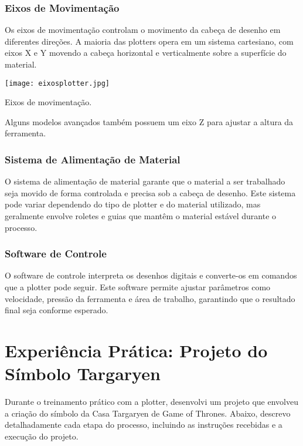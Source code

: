 \documentclass[
]{book}
\begin{document}
\subsubsection{Eixos de Movimentação}\label{eixos-de-movimentauxe7uxe3o-1}

Os eixos de movimentação controlam o movimento da cabeça de desenho em diferentes direções. A maioria das plotters opera em um sistema cartesiano, com eixos X e Y movendo a cabeça horizontal e verticalmente sobre a superfície do material.

\texttt{[image: eixosplotter.jpg]}

Eixos de movimentação.

Alguns modelos avançados também possuem um eixo Z para ajustar a altura da ferramenta.

\subsubsection{Sistema de Alimentação de Material}\label{sistema-de-alimentauxe7uxe3o-de-material}

O sistema de alimentação de material garante que o material a ser trabalhado seja movido de forma controlada e precisa sob a cabeça de desenho. Este sistema pode variar dependendo do tipo de plotter e do material utilizado, mas geralmente envolve roletes e guias que mantêm o material estável durante o processo.

\subsubsection{Software de Controle}\label{software-de-controle}

O software de controle interpreta os desenhos digitais e converte-os em comandos que a plotter pode seguir. Este software permite ajustar parâmetros como velocidade, pressão da ferramenta e área de trabalho, garantindo que o resultado final seja conforme esperado.

\section{Experiência Prática: Projeto do Símbolo Targaryen}\label{experiuxeancia-pruxe1tica-projeto-do-suxedmbolo-targaryen}

Durante o treinamento prático com a plotter, desenvolvi um projeto que envolveu a criação do símbolo da Casa Targaryen de Game of Thrones. Abaixo, descrevo detalhadamente cada etapa do processo, incluindo as instruções recebidas e a execução do projeto.
\end{document}
